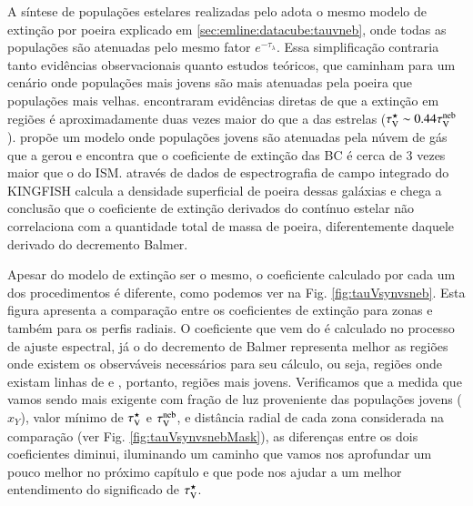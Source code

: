A síntese de populações estelares realizadas pelo \starlight adota o mesmo modelo de extinção por
poeira explicado em \ref{sec:emline:datacube:tauvneb}, onde todas as populações são atenuadas pelo
mesmo fator $e^{-\tau_\lambda}$. Essa simplificação contraria tanto evidências observacionais quanto
estudos teóricos, que caminham para um cenário onde populações mais jovens são mais atenuadas pela
poeira que populações mais velhas. \citet{Calzetti.etal.1994a} encontraram evidências diretas de que
a extinção em regiões \Hii é aproximadamente duas vezes maior do que a das estrelas ($\tau_{\mathrm{V}}^\star \sim
0.44 \tau_{\mathrm{V}}^{\mathrm{neb}}$). \citet{Charlot.Fall.2000a} propõe um modelo onde populações jovens são atenuadas pela
núvem de gás que a gerou e encontra que o coeficiente de extinção das BC é cerca de 3 vezes maior
que o do ISM. \citet{Kreckel.etal.2013a} através de dados de espectrografia de campo integrado do
KINGFISH calcula a densidade superficial de poeira dessas galáxias e chega a conclusão que o
coeficiente de extinção derivados do contínuo estelar não correlaciona com a quantidade total de
massa de poeira, diferentemente daquele derivado do decremento Balmer.

Apesar do modelo de extinção ser o mesmo, o coeficiente calculado por cada um dos procedimentos é
diferente, como podemos ver na Fig. \ref{fig:tauVsynvsneb}. Esta figura apresenta a comparação entre
os coeficientes de extinção para zonas e também para os perfis radiais. O coeficiente que vem do
\starlight é calculado no processo de ajuste espectral, já o do decremento de Balmer representa
melhor as regiões onde existem os observáveis necessários para seu cálculo, ou seja, regiões onde existam
linhas de \Halpha e \Hbeta, portanto, regiões mais jovens. Verificamos que a medida que vamos sendo
mais exigente com fração de luz proveniente das populações jovens ($x_Y$), valor mínimo de $\tau_{\mathrm{V}}^\star$
e $\tau_{\mathrm{V}}^{\mathrm{neb}}$, e distância radial de cada zona considerada na comparação (ver Fig.
\ref{fig:tauVsynvsnebMask}), as diferenças entre os dois coeficientes diminui, iluminando um caminho
que vamos nos aprofundar um pouco melhor no próximo capítulo e que pode nos ajudar a um melhor
entendimento do significado de $\tau_{\mathrm{V}}^\star$.

